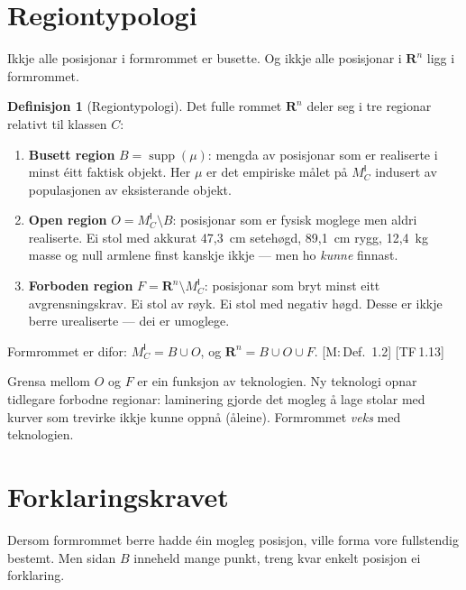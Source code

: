 \documentclass[10pt]{book}
\theoremstyle{definition}
\newtheorem{definisjon}{Definisjon}[chapter]
\theoremstyle{plain}
\theoremstyle{remark}
\newcommand{\MC}{M^{\mathsf{I}}_C}
\providecommand{\Rn}{}
\renewcommand{\Rn}{\mathbf{R}^n}
\DeclareMathOperator{\supp}{supp}
\newcommand{\TF}[1]{\textnormal{[TF\,#1]}}
\newcommand{\Mref}[1]{\textnormal{[M:\,#1]}}
\begin{document}
\section{Regiontypologi}\label{sec:formrom:regionar}

Ikkje alle posisjonar i formrommet er busette. Og ikkje alle posisjonar i $\Rn$ ligg i formrommet.

\begin{definisjon}[Regiontypologi]\label{def:regionar}
Det fulle rommet $\Rn$ deler seg i tre regionar relativt til klassen $C$:
\begin{enumerate}[label=(\roman*)]
  \item \textbf{Busett region} $B = \supp(\mu)$: mengda av posisjonar som er realiserte i minst \' eitt faktisk objekt. Her $\mu$ er det empiriske m\aa let p\aa{} $\MC$ indusert av populasjonen av eksisterande objekt.
  \item \textbf{Open region} $O = \MC \setminus B$: posisjonar som er fysisk moglege men aldri realiserte. Ei stol med akkurat 47,3~cm seteh\o gd, 89,1~cm rygg, 12,4~kg masse og null armlene finst kanskje ikkje --- men ho \emph{kunne} finnast.
  \item \textbf{Forboden region} $F = \Rn \setminus \MC$: posisjonar som bryt minst eitt avgrensningskrav. Ei stol av r\o yk. Ei stol med negativ h\o gd. Desse er ikkje berre urealiserte --- dei er umoglege.
\end{enumerate}
Formrommet er difor: $\MC = B \cup O$, og $\Rn = B \cup O \cup F$. \Mref{Def.~1.2} \TF{1.13}
\end{definisjon}

Grensa mellom $O$ og $F$ er ein funksjon av teknologien. Ny teknologi opnar tidlegare forbodne regionar: laminering gjorde det mogleg \aa{} lage stolar med kurver som trevirke ikkje kunne oppn\aa{} (\aa leine). Formrommet \emph{veks} med teknologien.

\section{Forklaringskravet}\label{sec:formrom:forklaring}

Dersom formrommet berre hadde \' ein mogleg posisjon, ville forma vore fullstendig bestemt. Men sidan $B$ inneheld mange punkt, treng kvar enkelt posisjon ei forklaring.
\end{document}
